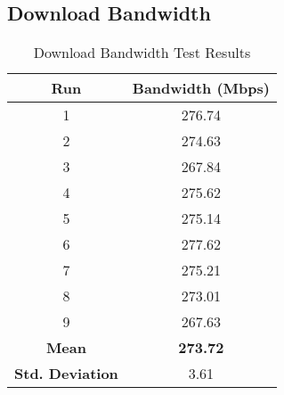 \subsection{Download Bandwidth}
\begin{table}[H]
\centering
\begin{tabular}{|c|c|}
\hline
\textbf{Run} & \textbf{Bandwidth (Mbps)} \\
\hline
1 & 276.74 \\
2 & 274.63 \\
3 & 267.84 \\
4 & 275.62 \\
5 & 275.14 \\
6 & 277.62 \\
7 & 275.21 \\
8 & 273.01 \\
9 & 267.63 \\
\hline
\textbf{Mean} & \textbf{273.72} \\
\textbf{Std. Deviation} & 3.61 \\
\hline
\end{tabular}
\caption{Download Bandwidth Test Results}
\end{table}

